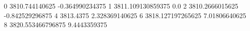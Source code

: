 0 3810.744140625 -0.364990234375
1 3811.109130859375 0.0
2 3810.2666015625 -0.842529296875
4 3813.4375 2.328369140625
6 3818.127197265625 7.01806640625
8 3820.553466796875 9.4443359375
